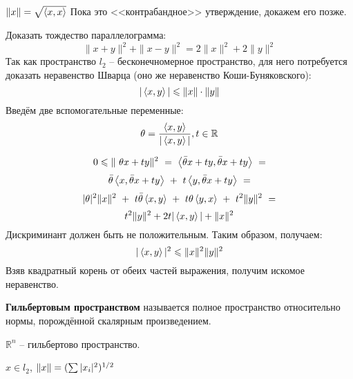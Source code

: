 	\begin{defi}
		$\|x\| = \sqrt{\left\langle x, x \right\rangle}$ {\color{gray} Пока это <<контрабандное>> утверждение, докажем его позже.}
	\end{defi}
	
	\exc Доказать тождество параллелограмма: 
	$$\|x+y\|^2 + \|x-y\|^2 = 2 \|x\|^2 + 2 \|y\|^2$$
	Так как пространство $l_2$ -- бесконечномерное пространство, для него потребуется доказать неравенство Шварца (оно же неравенство
	Коши-Буняковского):
	$$|\left\langle x, y \right\rangle| \leqslant \|x\| \cdot \|y\|$$
	Введём две вспомогательные переменные:
	$$\theta = \frac{\left\langle x, y \right\rangle}{|\left\langle x, y \right\rangle|}, t \in \mathbb{R}$$
	
	$$0 \leqslant \|\
	{\theta} x + t y\|^2 ~=~ \left\langle \bar{\theta} x + t y, \bar{\theta} x + t y \right\rangle ~= $$
	$$\bar{\theta} \left\langle x, \bar{\theta} x + t y \right\rangle ~+~ t \left\langle y, \bar{\theta} x + t y \right\rangle ~= $$
	$$|\theta|^2 \|x\|^2 ~+~ t \bar{\theta} \left\langle x, y \right\rangle ~+~ t \theta \left\langle y, x \right\rangle ~+~ t^2 \|y\|^2 ~= $$
	$$t^2 \|y\|^2 + 2t |\left\langle x, y \right\rangle| + \|x\|^2$$
	Дискриминант должен быть не положительным. Таким образом, получаем:
	$$|\left\langle x, y \right\rangle|^2 \leqslant \|x\|^2 \|y\|^2$$
	Взяв квадратный корень от обеих частей выражения, получим искомое неравенство.
	
	\begin{defi}
		\textbf{Гильбертовым пространством} называется полное пространство относительно нормы, порождённой скалярным произведением.
	\end{defi}
	
	\example $\mathbb{R}^n$ -- гильбертово пространство.
	
	\begin{defi}
		$x \in l_2$, $\left\| x \right\| = (\sum{|x_i|^2})^{1/2}$ 
	\end{defi}
